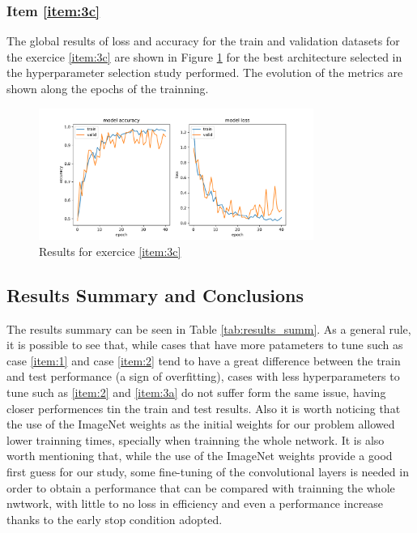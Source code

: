 \documentclass[10pt, a4paper]{article}
\begin{document}
\subsubsection{Item \ref{item:3c}}

The global results of loss and accuracy for the train and validation datasets for the exercice \ref{item:3c} are shown in Figure \ref{fig:e3c} for the best architecture selected 
in the hyperparameter selection study performed. The evolution of the metrics are shown along the epochs of the trainning.

\begin{figure}[htpb]
  \centering
  \includegraphics[width=0.8\textwidth]{images/3.c.pdf}
  \caption{Results for exercice \ref{item:3c}}
  \label{fig:e3c}
\end{figure}

\subsection{Results Summary and Conclusions}

The results summary can be seen in Table \ref{tab:results_summ}. As a general rule, it is possible to see that, while cases that have more patameters to tune such as
case \ref{item:1} and case \ref{item:2} tend to have a great difference between the train and test performance (a sign of overfitting), cases with less hyperparameters
to tune such as \ref{item:2} and \ref{item:3a} do not suffer form the same issue, having closer performences tin the train and test results. Also it is worth noticing
that the use of the ImageNet weights as the initial weights for our problem allowed lower trainning times, specially when trainning the whole network. It is also worth
mentioning that, while the use of the ImageNet weights provide a good first guess for our study, some fine-tuning of the convolutional layers is needed in order to 
obtain a performance that can be compared with trainning the whole nwtwork, with little to no loss in efficiency and even a performance increase thanks to the early stop condition
adopted.
\end{document}
